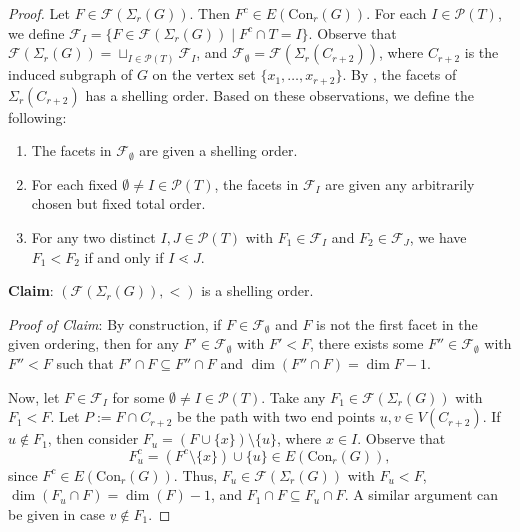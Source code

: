 \documentclass[10pt,a4paper]{amsart}
\newcommand{\Con}{{\mathrm{Con}}}
\def\F{\mathcal{F}}
\begin{document}
\begin{proof}
		 Let $F\in \mathcal F(\Sigma_{r}(G))$. Then $F^c\in E(\Con_r(G))$. For each $I\in\mathcal P(T)$, we define $\mathcal F_I=\{F\in \mathcal{F}(\Sigma_{r}(G))\mid F^c\cap T=I\}$. Observe that $\mathcal{F}(\Sigma_{r}(G))=\sqcup_{I\in\mathcal P(T)}\mathcal F_I$, and $\mathcal F_{\emptyset}=\mathcal F(\Sigma_{r}(C_{r+2}))$, where $C_{r+2}$ is the induced subgraph of $G$ on the vertex set $\{x_1,\ldots,x_{r+2}\}$. By , the facets of $\Sigma_{r}(C_{r+2})$ has a shelling order. Based on these observations, we define the following:   
		 \begin{enumerate}
		 	\item[$\bullet$] The facets in $\mathcal F_{\emptyset}$ are given a shelling order.
		 	
		 	\item[$\bullet$] For each fixed $\emptyset\neq I\in\mathcal P(T) $, the facets in $\F_I$ are given any arbitrarily chosen but fixed total order.
		 	
		 	\item[$\bullet$] For any two distinct $I,J\in \mathcal P(T)$ with $F_1\in \F_I$ and $F_2\in \F_J$, we have $F_1<F_2$ if and only if $I\lessdot J$.
		 \end{enumerate}
		 
		 \noindent
		 {\bf Claim}: $(\mathcal F(\Sigma_{r}(G)), <)$ is a shelling order.
		 
		 \vspace{.1cm}
		 \noindent
		 {\it Proof of Claim}: By construction, if $F\in \F_{\emptyset}$ and $F$ is not the first facet in the given ordering, then for any $F'\in \F_{\emptyset}$ with $F'<F$, there exists some $F''\in \F_{\emptyset}$ with $F''<F$ such that $F'\cap F\subseteq F''\cap F$ and $\dim(F''\cap F)=\dim F-1$.
		 
		 Now, let $F\in \F_I$ for some $\emptyset\neq I\in\mathcal P(T)$. Take any $F_1\in \F(\Sigma_{r}(G))$ with $F_1<F$. Let $P:=F\cap C_{r+2}$ be the path with two end points $u,v\in V(C_{r+2})$. If $u\notin F_1$, then consider $F_u=(F\cup\{x\})\setminus\{u\}$, where $x\in I$. Observe that
		  \[F_u^c=(F^c\setminus\{x\})\cup\{u\}\in E(\Con_r(G)),\]
		   since $F^c\in E(\Con_r(G))$. Thus, $F_u\in \F(\Sigma_{r}(G))$ with $F_u<F$, $\dim(F_u\cap F)=\dim(F)-1$, and $F_1\cap F\subseteq F_u\cap F$. A similar argument can be given in case $v\notin F_1$.
		   

\end{proof}
\end{document}
